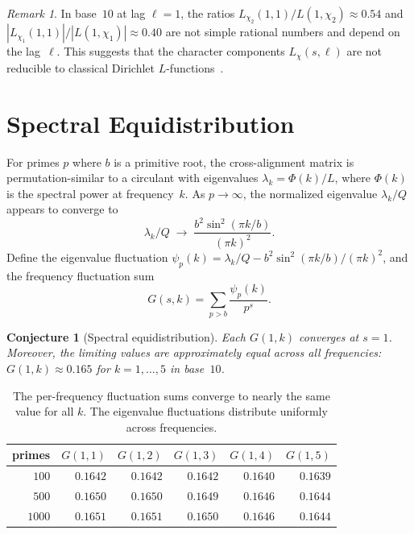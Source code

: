 \documentclass[12pt]{amsart}
\newtheorem{conjecture}[theorem]{Conjecture}
\theoremstyle{definition}
\theoremstyle{remark}
\newtheorem{remark}[theorem]{Remark}
\begin{document}
\begin{remark}
In base~$10$ at lag $\ell = 1$, the ratios
$L_{\chi_2}(1, 1) / L(1, \chi_2) \approx 0.54$ and
$|L_{\chi_1}(1, 1)| / |L(1, \chi_1)| \approx 0.40$
are not simple rational numbers and depend on the
lag~$\ell$. This suggests that the character components
$L_{\chi}(s, \ell)$ are not reducible to classical Dirichlet
$L$-functions~\cite{davenport,montgomery}.
\end{remark}

\section{Spectral Equidistribution}

For primes $p$ where $b$ is a primitive root, the
cross-alignment matrix is permutation-similar to a
circulant with eigenvalues
$\lambda_k = \Phi(k) / L$, where $\Phi(k)$ is the spectral
power at frequency~$k$. As $p \to \infty$, the normalized
eigenvalue $\lambda_k / Q$ appears to converge to
\[
\lambda_k / Q \;\longrightarrow\;
\frac{b^2 \sin^2(\pi k / b)}{(\pi k)^2}.
\]
Define the eigenvalue fluctuation
$\psi_p(k) = \lambda_k / Q - b^2 \sin^2(\pi k/b) / (\pi k)^2$,
and the frequency fluctuation sum
\[
G(s, k) = \sum_{p > b} \frac{\psi_p(k)}{p^s}.
\]

\begin{conjecture}[Spectral equidistribution]\label{conj:spectral}
Each $G(1, k)$ converges at $s = 1$. Moreover, the limiting
values are approximately equal across all frequencies:
$G(1, k) \approx 0.165$ for $k = 1, \ldots, 5$ in base~$10$.
\end{conjecture}

\begin{table}[h]
\centering
\begin{tabular}{rrrrrr}
\toprule
primes & $G(1,1)$ & $G(1,2)$ & $G(1,3)$ & $G(1,4)$ & $G(1,5)$ \\
\midrule
$100$ & $0.1642$ & $0.1642$ & $0.1642$ & $0.1640$ & $0.1639$ \\
$500$ & $0.1650$ & $0.1650$ & $0.1649$ & $0.1646$ & $0.1644$ \\
$1000$ & $0.1651$ & $0.1651$ & $0.1650$ & $0.1646$ & $0.1644$ \\
\bottomrule
\end{tabular}
\caption{The per-frequency fluctuation sums converge to
nearly the same value for all $k$. The eigenvalue fluctuations
distribute uniformly across frequencies.}
\label{tab:spectral}
\end{table}
\end{document}
